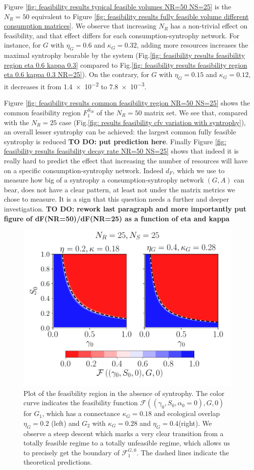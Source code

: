 \documentclass[12pt, titlepage]{report}
\begin{document}
Figure \ref{fig: feasibility results typical feasible volumes NR=50 NS=25} is the $N_R=50$ equivalent to Figure \ref{fig: feasibility results fully feasible volume different consumption matrices}. We observe that increasing $N_R$ has a non-trivial effect on feasibility, and that effect differs for each consumption-syntrophy network. For instance, for $G$ with $\eta_G=0.6$ and $\kappa_G=0.32$, adding more resources increases the maximal syntrophy bearable by the system (Fig.\ref{fig: feasibility results feasibility region eta 0.6 kappa 0.3} compared to Fig.\ref{fig: feasibility results feasibility region eta 0.6 kappa 0.3 NR=25}). On the contrary, for $G$ with $\eta_G=0.15$ and $\kappa_G=0.12$, it decreases it from \num{1.4e-2} to \num{7.8e-3}.

Figure \ref{fig: feasibility results common feasibility region NR=50 NS=25} shows the common feasibility region $F_1^{S_{50}}$ of the $N_R=50$ matrix set. We see that, compared with the $N_R=25$ case (Fig.\ref{fig: results feasibility cfv variation with syntrophy}), an overall lesser syntrophy can be achieved: the largest common fully feasible syntrophy is reduced \textbf{TO DO: put prediction here}. Finally Figure \ref{fig: feasibility results feasibility decay rate NR=50 NS=25} shows that indeed it is really hard to predict the effect that increasing the number of resources will have on a specific consumption-syntrophy network. Indeed $d_F$, which we use to measure how big of a syntrophy a consumption-syntrophy network $(G,A)$ can bear, does not have a clear pattern, at least not under the matrix metrics we chose to measure. It is a sign that this question needs a further and deeper investigation. \textbf{TO DO: rework last paragraph and more importantly put figure of dF(NR=50)/dF(NR=25) as a function of eta and kappa}
\begin{figure}[h!]
\centering
\includegraphics[width=0.7\linewidth]{typical_feasibility_volume}
\caption{Plot of the feasibility region in the absence of syntrophy. The color curve indicates the feasibility function $\mathcal{F}\left((\gamma_0, S_0, \alpha_0=0), G, 0\right)$ for $G_1$, which has a connectance $\kappa_{G}=0.18$ and ecological overlap $\eta_{G}=0.2$ (left) and $G_2$ with $\kappa_G=0.28$ and $\eta_G=0.4$(right). We observe a steep descent which marks a very clear transition from a totally feasible regime to a totally unfeasible regime, which allows us to precisely get the boundary of $\mathcal{F}^{G, 0}_1$. The dashed lines indicate the theoretical predictions.}
\label{fig: typical feasibility region}
\end{figure}
\end{document}
